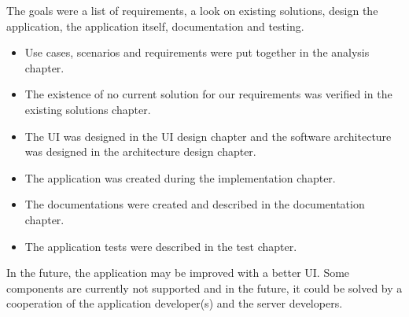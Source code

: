 % 

The goals were a list of requirements, a look on existing solutions, design the application, the application itself, documentation and testing.

\begin{itemize}
    \item Use cases, scenarios and requirements were put together in the analysis chapter.
    \item The existence of no current solution for our requirements was verified in the existing solutions chapter.
    \item The UI was designed in the UI design chapter and the software architecture was designed in the architecture design chapter.
    \item The application was created during the implementation chapter.
    \item The documentations were created and described in the documentation chapter.
    \item The application tests were described in the test chapter.
\end{itemize}

In the future, the application may be improved with a better UI.
Some components are currently not supported and in the future, it could be solved by a cooperation of the application developer(s) and the server developers.